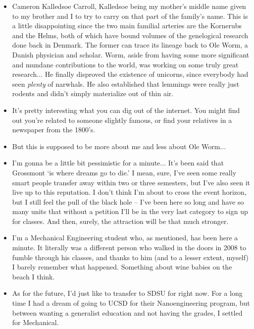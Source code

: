 \documentclass{article}
\begin{document}
  \begin{itemize}
    \item Cameron Kalledsoe Carroll, Kalledsoe being my mother's middle name given to my brother and I to try to carry on that part of the family's name. This is a little disappointing since the two main familial arteries are the Kornerubs and the Helms, both of which have bound volumes of the genelogical research done back in Denmark. The former can trace its lineage back to Ole Worm, a Danish physician and scholar. Worm, aside from having some more significant and mundane contributions to the world, was working on some truly great research... He finally disproved the existence of unicorns, since everybody had seen \emph{plenty} of narwhals. He also established that lemmings were really just rodents and didn't simply materialize out of thin air. 
    \item It's pretty interesting what you can dig out of the internet. You might find out you're related to someone slightly famous, or find your relatives in a newspaper from the 1800's.
    \item But this is supposed to be more about me and less about Ole Worm...
    \item I'm gonna be a little bit pessimistic for a minute... It's been said that Grossmont `is where dreams go to die.' I mean, sure, I've seen some really smart people transfer away within two or three semesters, but I've also seen it live up to this reputation. I don't think I'm about to cross the event horizon, but I still feel the pull of the black hole -- I've been here so long and have so many units that without a petition I'll be in the very last category to sign up for classes. And then, surely, the attraction will be that much stronger.
    \item I'm a Mechanical Engineering student who, as mentioned, has been here a minute. It literally was a different person who walked in the doors in 2008 to fumble through his classes, and thanks to him (and to a lesser extent, myself) I barely remember what happened. Something about wine babies on the beach I think.
    \item As for the future, I'd just like to transfer to SDSU for right now. For a long time I had a dream of going to UCSD for their Nanoengineering program, but between wanting a generalist education and not having the grades, I settled for Mechanical.

  \end{itemize}
\end{document}
